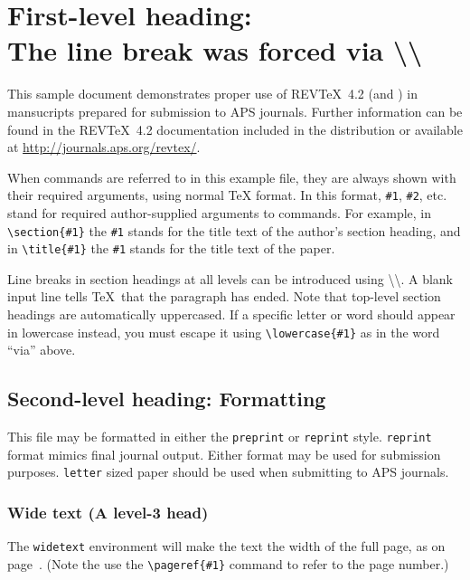 \documentclass[%
 reprint,
 amsmath,amssymb,
 aps,
]{revtex4-2}
\begin{document}

\section{\label{sec:level1}First-level heading:\protect\\ The line
break was forced \lowercase{via} \textbackslash\textbackslash}

This sample document demonstrates proper use of REV\TeX~4.2 (and
\LaTeXe) in mansucripts prepared for submission to APS
journals. Further information can be found in the REV\TeX~4.2
documentation included in the distribution or available at
\url{http://journals.aps.org/revtex/}.

When commands are referred to in this example file, they are always
shown with their required arguments, using normal \TeX{} format. In
this format, \verb+#1+, \verb+#2+, etc. stand for required
author-supplied arguments to commands. For example, in
\verb+\section{#1}+ the \verb+#1+ stands for the title text of the
author's section heading, and in \verb+\title{#1}+ the \verb+#1+
stands for the title text of the paper.

Line breaks in section headings at all levels can be introduced using
\textbackslash\textbackslash. A blank input line tells \TeX\ that the
paragraph has ended. Note that top-level section headings are
automatically uppercased. If a specific letter or word should appear in
lowercase instead, you must escape it using \verb+\lowercase{#1}+ as
in the word ``via'' above.

\subsection{\label{sec:level2}Second-level heading: Formatting}

This file may be formatted in either the \texttt{preprint} or
\texttt{reprint} style. \texttt{reprint} format mimics final journal output. 
Either format may be used for submission purposes. \texttt{letter} sized paper should
be used when submitting to APS journals.


\subsubsection{Wide text (A level-3 head)}
The \texttt{widetext} environment will make the text the width of the
full page, as on page~\pageref{eq:wideeq}. (Note the use the
\verb+\pageref{#1}+ command to refer to the page number.) 
\end{document}
